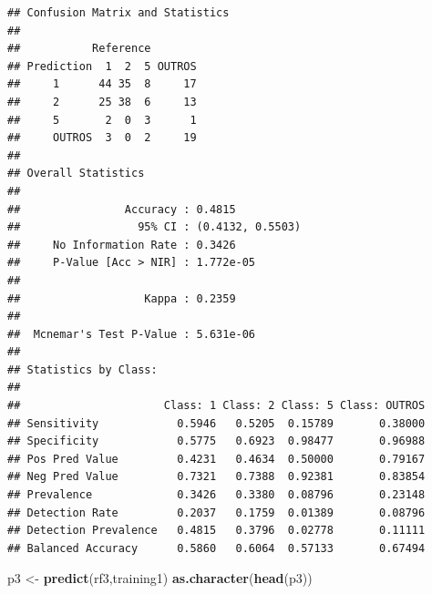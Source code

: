 \documentclass[]{article}
\newenvironment{Shaded}{\begin{snugshade}}{\end{snugshade}}
\newcommand{\CommentTok}[1]{\textcolor[rgb]{0.56,0.35,0.01}{\textit{#1}}}
\newcommand{\DataTypeTok}[1]{\textcolor[rgb]{0.13,0.29,0.53}{#1}}
\newcommand{\DecValTok}[1]{\textcolor[rgb]{0.00,0.00,0.81}{#1}}
\newcommand{\KeywordTok}[1]{\textcolor[rgb]{0.13,0.29,0.53}{\textbf{#1}}}
\newcommand{\NormalTok}[1]{#1}
\newcommand{\OperatorTok}[1]{\textcolor[rgb]{0.81,0.36,0.00}{\textbf{#1}}}
\newcommand{\StringTok}[1]{\textcolor[rgb]{0.31,0.60,0.02}{#1}}
\begin{document}
\begin{Shaded}
\end{Shaded}

\begin{verbatim}
## Confusion Matrix and Statistics
## 
##           Reference
## Prediction  1  2  5 OUTROS
##     1      44 35  8     17
##     2      25 38  6     13
##     5       2  0  3      1
##     OUTROS  3  0  2     19
## 
## Overall Statistics
##                                           
##                Accuracy : 0.4815          
##                  95% CI : (0.4132, 0.5503)
##     No Information Rate : 0.3426          
##     P-Value [Acc > NIR] : 1.772e-05       
##                                           
##                   Kappa : 0.2359          
##                                           
##  Mcnemar's Test P-Value : 5.631e-06       
## 
## Statistics by Class:
## 
##                      Class: 1 Class: 2 Class: 5 Class: OUTROS
## Sensitivity            0.5946   0.5205  0.15789       0.38000
## Specificity            0.5775   0.6923  0.98477       0.96988
## Pos Pred Value         0.4231   0.4634  0.50000       0.79167
## Neg Pred Value         0.7321   0.7388  0.92381       0.83854
## Prevalence             0.3426   0.3380  0.08796       0.23148
## Detection Rate         0.2037   0.1759  0.01389       0.08796
## Detection Prevalence   0.4815   0.3796  0.02778       0.11111
## Balanced Accuracy      0.5860   0.6064  0.57133       0.67494
\end{verbatim}

\begin{Shaded}
\begin{Highlighting}[]
\NormalTok{p3 <-}\StringTok{ }\KeywordTok{predict}\NormalTok{(rf3,training1)}
\KeywordTok{as.character}\NormalTok{(}\KeywordTok{head}\NormalTok{(p3))}
\end{Highlighting}
\end{Shaded}
\end{document}
